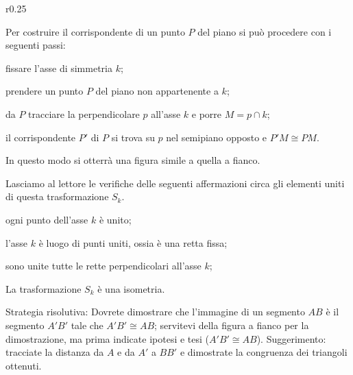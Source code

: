 \setlength{\intextsep}{3pt plus 2.0pt minus 2.0pt}
\begin{wrapfigure}{r}{0.25\textwidth}
	\centering
\end{wrapfigure}
Per costruire il corrispondente di un punto \(P\) del piano si può 
procedere con i seguenti passi:
\begin{enumerate*}
\item fissare l'asse di simmetria \(k\);
\item prendere un punto \(P\) del piano non appartenente a \(k\);
\item da \(P\) tracciare la perpendicolare \(p\) all'asse \(k\) e porre 
\(M=p\cap k\);
\item il corrispondente \(P'\) di \(P\) si trova su \(p\) nel semipiano 
opposto e \(P'M\cong PM\).
\end{enumerate*}

In questo modo si otterrà una figura simile a quella a fianco.

Lasciamo al lettore le verifiche delle seguenti affermazioni circa 
gli elementi uniti di questa trasformazione \(S_k\).
\begin{itemize*}
\item ogni punto dell'asse \(k\) è unito;
\item l'asse \(k\) è luogo di punti uniti, ossia è una retta fissa;
\item sono unite tutte le rette perpendicolari all'asse \(k\);
\end{itemize*}
\setlength{\intextsep}{\defintextsep}

\begin{teorema}\label{teo:8.3}
La trasformazione \(S_k\) è una isometria.
\end{teorema}

\noindent\begin{minipage}{0.65\textwidth}\parindent15pt
Strategia risolutiva:
Dovrete dimostrare che l'immagine di un segmento \(AB\) è il segmento 
\(A'B'\) tale che \(A'B'\cong AB\); servitevi della figura a fianco per 
la dimostrazione, ma prima indicate ipotesi e tesi (\(A'B'\cong AB\)).
Suggerimento: tracciate la distanza da \(A\) e da \(A'\) a \(BB'\) e 
dimostrate la congruenza dei triangoli ottenuti.
\end{minipage}\hfil
\begin{minipage}{0.35\textwidth}
	\centering
\end{minipage}\vspace{5pt}

